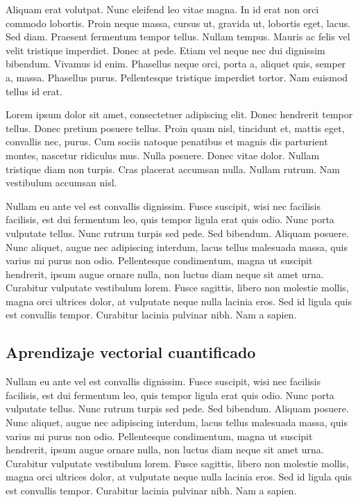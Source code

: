 Aliquam erat volutpat.  Nunc eleifend leo vitae magna.  In id erat non
orci commodo lobortis.  Proin neque massa, cursus ut, gravida ut,
lobortis eget, lacus.  Sed diam.  Praesent fermentum tempor tellus.
Nullam tempus.  Mauris ac felis vel velit tristique imperdiet.  Donec
at pede.  Etiam vel neque nec dui dignissim bibendum.  Vivamus id
enim.  Phasellus neque orci, porta a, aliquet quis, semper a, massa.
Phasellus purus.  Pellentesque tristique imperdiet tortor.  Nam
euismod tellus id erat.

Lorem ipsum dolor sit amet, consectetuer adipiscing elit.  Donec
hendrerit tempor tellus.  Donec pretium posuere tellus.  Proin quam
nisl, tincidunt et, mattis eget, convallis nec, purus.  Cum sociis
natoque penatibus et magnis dis parturient montes, nascetur ridiculus
mus.  Nulla posuere.  Donec vitae dolor.  Nullam tristique diam non
turpis.  Cras placerat accumsan nulla.  Nullam rutrum.  Nam vestibulum
accumsan nisl.


Nullam eu ante vel est convallis dignissim.  Fusce suscipit, wisi nec
facilisis facilisis, est dui fermentum leo, quis tempor ligula erat
quis odio.  Nunc porta vulputate tellus.  Nunc rutrum turpis sed pede.
Sed bibendum.  Aliquam posuere.  Nunc aliquet, augue nec adipiscing
interdum, lacus tellus malesuada massa, quis varius mi purus non odio.
Pellentesque condimentum, magna ut suscipit hendrerit, ipsum augue
ornare nulla, non luctus diam neque sit amet urna.  Curabitur
vulputate vestibulum lorem.  Fusce sagittis, libero non molestie
mollis, magna orci ultrices dolor, at vulputate neque nulla lacinia
eros.  Sed id ligula quis est convallis tempor.  Curabitur lacinia
pulvinar nibh.  Nam a sapien.

\subsection{Aprendizaje vectorial cuantificado}

Nullam eu ante vel est convallis dignissim.  Fusce suscipit, wisi nec
facilisis facilisis, est dui fermentum leo, quis tempor ligula erat
quis odio.  Nunc porta vulputate tellus.  Nunc rutrum turpis sed pede.
Sed bibendum.  Aliquam posuere.  Nunc aliquet, augue nec adipiscing
interdum, lacus tellus malesuada massa, quis varius mi purus non odio.
Pellentesque condimentum, magna ut suscipit hendrerit, ipsum augue
ornare nulla, non luctus diam neque sit amet urna.  Curabitur
vulputate vestibulum lorem.  Fusce sagittis, libero non molestie
mollis, magna orci ultrices dolor, at vulputate neque nulla lacinia
eros.  Sed id ligula quis est convallis tempor.  Curabitur lacinia
pulvinar nibh.  Nam a sapien.

